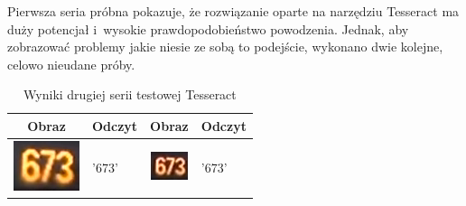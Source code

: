 Pierwsza seria próbna pokazuje, że rozwiązanie oparte na narzędziu
Tesseract ma duży potencjał i~wysokie prawdopodobieństwo powodzenia.
Jednak, aby zobrazować problemy jakie niesie ze sobą to podejście,
wykonano dwie kolejne, celowo nieudane próby.

\begin{table}[h!]
  \centering
  \caption{Wyniki drugiej serii testowej Tesseract}\label{tbl:tess_02}
  \begin{tabular}{| c | l | c | l |}
  	\hline
    Obraz & Odczyt & Obraz & Odczyt  \\ 
    \hline
    \begin{minipage}{.2\textwidth}
      \includegraphics[width=\textwidth]{img/exp_number_n01}
    \end{minipage}
    &
    '673'
    &
    \begin{minipage}{.2\textwidth}
      \includegraphics[width=\textwidth]{img/exp_number_n02}
    \end{minipage}
    &
    '673'
     

\end{tabular}
\end{table}
